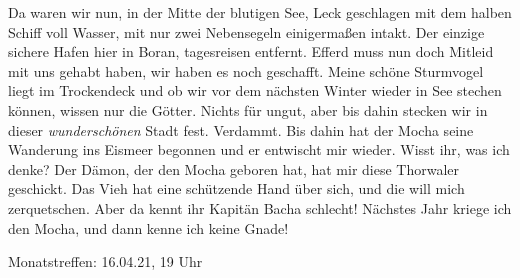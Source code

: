 \documentclass[final]{multiversum}
\begin{document}
Da waren wir nun, in der Mitte der blutigen See, Leck geschlagen mit dem halben Schiff voll Wasser, mit nur zwei Nebensegeln einigermaßen intakt.
Der einzige sichere Hafen hier in Boran, tagesreisen entfernt.
Efferd muss nun doch Mitleid mit uns gehabt haben, wir haben es noch geschafft.
Meine schöne Sturmvogel liegt im Trockendeck und ob wir vor dem nächsten Winter wieder in See stechen können, wissen nur die Götter.
Nichts für ungut, aber bis dahin stecken wir in dieser \textit{wunderschönen} Stadt fest.
Verdammt.
Bis dahin hat der Mocha seine Wanderung ins Eismeer begonnen und er entwischt mir wieder.
Wisst ihr, was ich denke?
Der Dämon, der den Mocha geboren hat, hat mir diese Thorwaler geschickt.
Das Vieh hat eine schützende Hand über sich, und die will mich zerquetschen.
Aber da kennt ihr Kapitän Bacha schlecht!
Nächstes Jahr kriege ich den Mocha, und dann kenne ich keine Gnade!


\begin{termine}
\item Monatstreffen: 16.04.21, 19 Uhr

\end{termine}
\impressum
\end{document}
